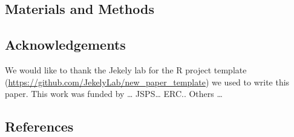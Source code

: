 \documentclass[
  11pt,
]{article}
\begin{document}
\subsection{Materials and Methods}\label{materials-and-methods}

\subsection{Acknowledgements}\label{acknowledgements}

We would like to thank the Jekely lab for the R project template
(\url{https://github.com/JekelyLab/new_paper_template}) we used to write
this paper. This work was funded by \ldots{} JSPS\ldots{} ERC.. Others
\ldots{}

\subsection{References}\label{references}
\end{document}
